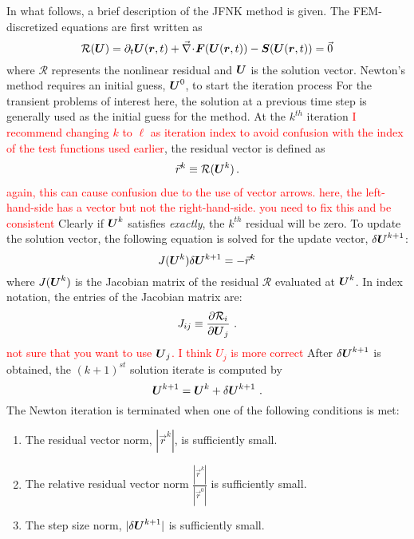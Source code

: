 In what follows, a brief description of the JFNK method is given.  The FEM-discretized equations are first written as
\begin{equation}
  \label{eqn:F}
  \mathcal{R} (\boldsymbol U) = \partial_t \boldsymbol U(\boldsymbol r, t) + \vec{\nabla}\! \cdot \! \boldsymbol F(\boldsymbol U(\boldsymbol r, t)) - \boldsymbol S(\boldsymbol U(\boldsymbol r, t)) = \vec{0}
\end{equation}
where $\mathcal{R}$ represents the nonlinear residual and $\boldsymbol U$
is the solution vector. Newton's method requires an initial guess,
$\boldsymbol U^0$, to start the iteration process For the transient
problems of interest here, the solution at a previous time step is
generally used as the initial guess for the method. At the $k^{th}$
iteration \textcolor{red}{I recommend changing $k$ to $\ell$ as iteration index to avoid confusion with the index of the test functions used earlier}, the residual vector is defined as
\begin{align}
  \vec{r}^k \equiv \mathcal{R} (\boldsymbol U^k)\,.
\end{align}
\textcolor{red}{again, this can cause confusion due to the use of vector arrows. here, the left-hand-side has a vector but not the right-hand-side. you need to fix this and be consistent}
Clearly if $\boldsymbol U^k$ satisfies  \emph{exactly}, the
$k^{th}$ residual will be zero.  To update the solution vector, the
following equation is solved for the update vector, $\delta
\boldsymbol U^{k+1}$:
\begin{equation}
  \label{eqn:newton_correction}
J (\boldsymbol U^k) \delta \boldsymbol U^{k+1} = - \vec{r}^k
\end{equation}
where $J(\boldsymbol U^k)$ is the Jacobian
matrix of the residual $\mathcal{R}$ evaluated at $\boldsymbol U^k$.  In index notation, the entries of the Jacobian matrix are:
\begin{equation}
  \label{eqn:jacobian_matrix}
  J_{ij} \equiv \frac {\partial \mathcal{R}_i} {\partial \boldsymbol U_j} \,\,.
\end{equation}
\textcolor{red}{not sure that you want to use $\boldsymbol U_j$. I think $U_j$ is more correct}
After $\delta \boldsymbol U^{k+1}$ is obtained, the $(k+1)^{st}$ solution iterate
is computed by
\begin{equation}
  \boldsymbol U^{k+1} = \boldsymbol U^{k} + \delta \boldsymbol U^{k+1} \,\,.
\end{equation}
The Newton iteration is terminated when one of the following conditions is met:
\begin{enumerate}
\item The residual vector norm, $|\vec{r}^k|$, is sufficiently small.
\item The relative residual vector norm $\frac{|\vec{r}^k|}{|\vec{r}^0|}$  is sufficiently small.
\item The step size norm, $|\delta \boldsymbol U^{k+1}|$ is sufficiently small.
\end{enumerate}

